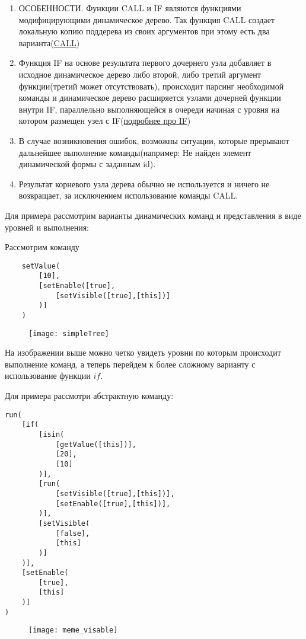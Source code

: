 \documentclass[../index.tex]{subfiles}
\begin{document}
\begin{enumerate}
    \item ОСОБЕННОСТИ. Функции CALL и IF являются функциями модифицирующими динамическое дерево. Так функция CALL создает локальную копию поддерева из своих аргументов при этому есть два варианта(\hyperref[sec:fcall]{CALL})
    \item Функция IF на основе результата первого дочернего узла добавляет в исходное динамическое дерево либо второй, либо третий аргумент функции(третий может отсутствовать), происходит парсинг необходимой команды и динамическое дерево расширяется узлами дочерней функции внутри IF, параллельно выполняющейся в очереди начиная с уровня на котором размещен узел с IF(\hyperref[sec:fif]{подробнее про IF})
    \item В случае возникновения ошибок, возможны ситуации, которые прерывают дальнейшее выполнение команды(например: Не найден элемент динамической формы с заданным id).
    \item Результат корневого узла дерева обычно не используется и ничего не возвращает, за исключением  использование команды CALL.
\end{enumerate}
Для примера рассмотрим варианты динамических команд и представления в виде уровней и выполнения:

Рассмотрим команду 
\begin{verbatim}
    setValue(
        [10],
        [setEnable([true],
            [setVisible([true],[this])]
        )]
    )
\end{verbatim}

\begin{figure}[h]
	\texttt{[image: simpleTree]}
	\centering
\end{figure}
На изображении выше можно четко увидеть уровни по которым происходит выполнение команд, а теперь перейдем к более сложному варианту с использование функции $if$.

Для примера рассмотри абстрактную команду:
\begin{verbatim}
run(
    [if(
        [isin(
            [getValue([this])],
            [20],
            [10]
        )],
        [run(
            [setVisible([true],[this])],
            [setEnable([true],[this])],
        )],
        [setVisible(
            [false],
            [this]
        )]
    )],
    [setEnable(
        [true],
        [this]
    )]
)
\end{verbatim}

\begin{figure}[h]
	\texttt{[image: meme\_visable]}
	\centering
\end{figure}
\end{document}
